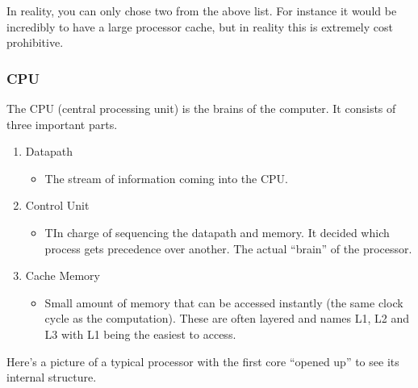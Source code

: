 \documentclass[12pt, twoside, exarticle]{article}
\begin{document}
In reality, you can only chose two from the above list.  For instance it would be incredibly to have a large processor cache, but in reality this is extremely cost prohibitive. \\

\subsubsection{CPU}

The CPU (central processing unit) is the brains of the computer.  It consists of three important parts.
\begin{enumerate}
\item Datapath
	\begin{itemize}
	\item The stream of information coming into the CPU.
	\end{itemize}
\item Control Unit
	\begin{itemize}
	\item TIn charge of sequencing the datapath and memory.  It decided which process gets precedence over another.  The actual ``brain'' of the processor.
	\end{itemize}
\item Cache Memory
	\begin{itemize}
	\item Small amount of memory that can be accessed instantly (the same clock cycle as the computation).  These are often layered and names L1, L2 and L3 with L1 being the easiest to access.
	\end{itemize}		
\end{enumerate}

Here's a picture of a typical processor with the first core ``opened up'' to see its internal structure. \\

\end{document}
